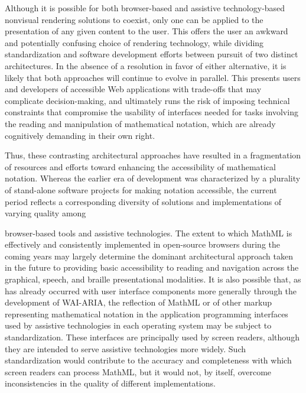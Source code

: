\documentclass[11.5pt]{sig-alternate} %
\begin{document}
\begin{large}
Although it is possible for both browser-based and assistive technology-based nonvisual rendering solutions to coexist, only one can be applied to the presentation of any given content to the user. This offers the user an awkward and potentially confusing choice of rendering technology, while dividing standardization and software development efforts between pursuit of two distinct architectures. In the absence of a resolution in favor of either alternative, it is likely that both approaches will continue to evolve in parallel. This presents users and developers of accessible Web applications with trade-offs that may complicate decision-making, and ultimately runs the risk of imposing technical constraints that compromise the usability of interfaces needed for tasks involving the reading and manipulation of mathematical notation, which are already cognitively demanding in their own right.

Thus, these contrasting architectural approaches have resulted in a fragmentation of resources and efforts toward enhancing the accessibility of mathematical notation. Whereas the earlier era of development was characterized by a plurality of stand-alone software projects for making notation accessible, the current period reflects a corresponding diversity of solutions and implementations of varying quality among
 
browser-based tools and assistive technologies. The extent to which MathML is effectively and consistently implemented in open-source browsers during the coming years may largely determine the dominant architectural approach taken in the future to providing basic accessibility to reading and navigation across the graphical, speech, and braille presentational modalities. It is also possible that, as has already occurred with user interface components more generally through the development of WAI-ARIA, the reflection of MathML or of other markup representing mathematical notation in the application programming interfaces used by assistive technologies in each operating system may be subject to standardization. These interfaces are principally used by screen readers, although they are intended to serve assistive technologies more widely. Such standardization would contribute to the accuracy and completeness with which screen readers can process MathML, but it would not, by itself, overcome inconsistencies in the quality of different implementations.


\end{large}
\end{document}
